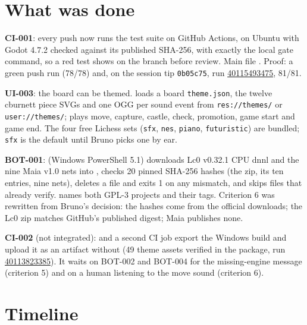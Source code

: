 \documentclass[11pt,a4paper]{article}
\begin{document}
\section*{What was done}

\textbf{CI-001}: every push now runs the test suite on GitHub Actions, on Ubuntu with Godot
4.7.2 checked against its published SHA-256, with exactly the local gate command, so a red
test shows on the branch before review. Main file . Proof: a
green push run (78/78) and, on the session tip \texttt{0b05c75}, run
\href{https://github.com/Laginho/P-Chess/actions/runs/40115493475}{40115493475}, 81/81.

\textbf{UI-003}: the board can be themed.  loads a board
\texttt{theme.json}, the twelve cburnett piece SVGs and one OGG per sound event from
\texttt{res://themes/} or \texttt{user://themes/};  plays move,
capture, castle, check, promotion, game start and game end. The four free Lichess sets
(\texttt{sfx}, \texttt{nes}, \texttt{piano}, \texttt{futuristic}) are bundled; \texttt{sfx}
is the default until Bruno picks one by ear.

\textbf{BOT-001}:  (Windows PowerShell 5.1) downloads Lc0
v0.32.1 CPU dnnl and the nine Maia v1.0 nets into , checks 20 pinned SHA-256
hashes (the zip, its ten entries, nine nets), deletes a file and exits 1 on any mismatch, and
skips files that already verify.  names both GPL-3 projects and
their tags. Criterion 6 was rewritten from Bruno's decision: the hashes come from the
official downloads; the Lc0 zip matches GitHub's published digest; Maia publishes none.

\textbf{CI-002} (not integrated):  and a second CI job export the
Windows build and upload it as an artifact without  (49 theme assets verified
in the package, run
\href{https://github.com/Laginho/P-Chess/actions/runs/40113823385}{40113823385}). It waits on
BOT-002 and BOT-004 for the missing-engine message (criterion 5) and on a human listening to
the move sound (criterion 6).

\section*{Timeline}
\end{document}

